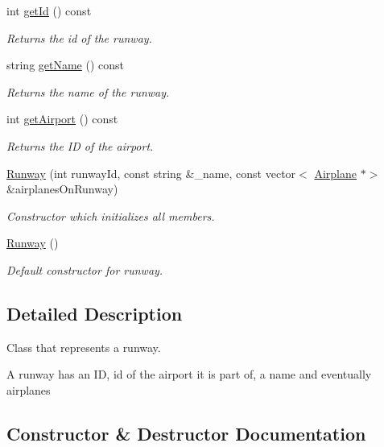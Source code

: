 \begin{DoxyCompactItemize}
int \mbox{\hyperlink{class_runway_afd718b92fbf2bdcbdc5c3da48a76c7af}{get\+Id}} () const
\begin{DoxyCompactList}\small\item\em Returns the id of the runway. \end{DoxyCompactList}\item 
string \mbox{\hyperlink{class_runway_a525e4c94639bde05c335492d5229f882}{get\+Name}} () const
\begin{DoxyCompactList}\small\item\em Returns the name of the runway. \end{DoxyCompactList}\item 
int \mbox{\hyperlink{class_runway_ac6d84fd93863115c2b96912b4432d76e}{get\+Airport}} () const
\begin{DoxyCompactList}\small\item\em Returns the ID of the airport. \end{DoxyCompactList}\item 
\mbox{\hyperlink{class_runway_a9907eac3d79e7a4bddd8b00bf1a15bce}{Runway}} (int runway\+Id, const string \&\+\_\+name, const vector$<$ \mbox{\hyperlink{class_airplane}{Airplane}} $\ast$$>$ \&airplanes\+On\+Runway)
\begin{DoxyCompactList}\small\item\em Constructor which initializes all members. \end{DoxyCompactList}\item 
\mbox{\hyperlink{class_runway_a75b9355b4953bd430f7c6ea0a18b465a}{Runway}} ()
\begin{DoxyCompactList}\small\item\em Default constructor for runway. \end{DoxyCompactList}\end{DoxyCompactItemize}


\subsection{Detailed Description}
Class that represents a runway. 

A runway has an ID, id of the airport it is part of, a name and eventually airplanes 

\subsection{Constructor \& Destructor Documentation}
\mbox{\label{class_runway_a9907eac3d79e7a4bddd8b00bf1a15bce}} 
